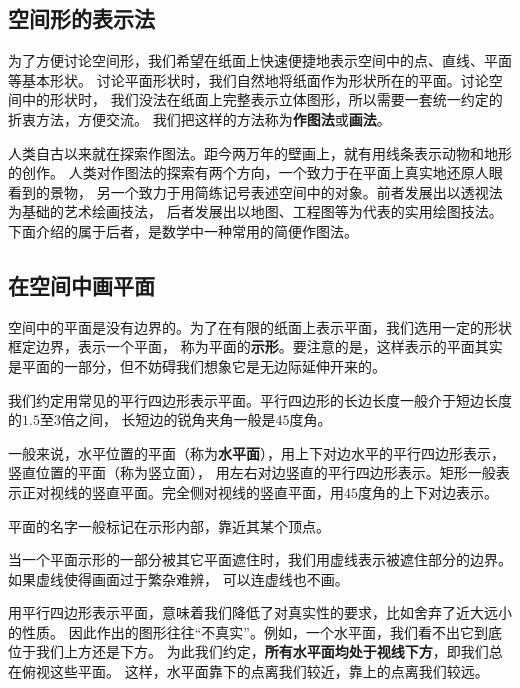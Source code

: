 \documentclass[12pt,UTF8]{ctexbook}
\begin{document}

\begin{appendix}

\chapter{空间形的表示法}

为了方便讨论空间形，我们希望在纸面上快速便捷地表示空间中的点、直线、平面等基本形状。
讨论平面形状时，我们自然地将纸面作为形状所在的平面。讨论空间中的形状时，
我们没法在纸面上完整表示立体图形，所以需要一套统一约定的折衷方法，方便交流。
我们把这样的方法称为\textbf{作图法}或\textbf{画法}。

人类自古以来就在探索作图法。距今两万年的壁画上，就有用线条表示动物和地形的创作。
人类对作图法的探索有两个方向，一个致力于在平面上真实地还原人眼看到的景物，
另一个致力于用简练记号表述空间中的对象。前者发展出以透视法为基础的艺术绘画技法，
后者发展出以地图、工程图等为代表的实用绘图技法。
下面介绍的属于后者，是数学中一种常用的简便作图法。

\section{在空间中画平面}

空间中的平面是没有边界的。为了在有限的纸面上表示平面，我们选用一定的形状框定边界，表示一个平面，
称为平面的\textbf{示形}。要注意的是，这样表示的平面其实是平面的一部分，但不妨碍我们想象它是无边际延伸开来的。

我们约定用常见的平行四边形表示平面。平行四边形的长边长度一般介于短边长度的$1.5$至$3$倍之间，
长短边的锐角夹角一般是$45$度角。

一般来说，水平位置的平面（称为\textbf{水平面}），用上下对边水平的平行四边形表示，竖直位置的平面（称为竖立面），
用左右对边竖直的平行四边形表示。矩形一般表示正对视线的竖直平面。完全侧对视线的竖直平面，用$45$度角的上下对边表示。

平面的名字一般标记在示形内部，靠近其某个顶点。

当一个平面示形的一部分被其它平面遮住时，我们用虚线表示被遮住部分的边界。如果虚线使得画面过于繁杂难辨，
可以连虚线也不画。

用平行四边形表示平面，意味着我们降低了对真实性的要求，比如舍弃了近大远小的性质。
因此作出的图形往往“不真实”。例如，一个水平面，我们看不出它到底位于我们上方还是下方。
为此我们约定，\textbf{所有水平面均处于视线下方}，即我们总在俯视这些平面。
这样，水平面靠下的点离我们较近，靠上的点离我们较远。


\end{appendix}
\end{document}
